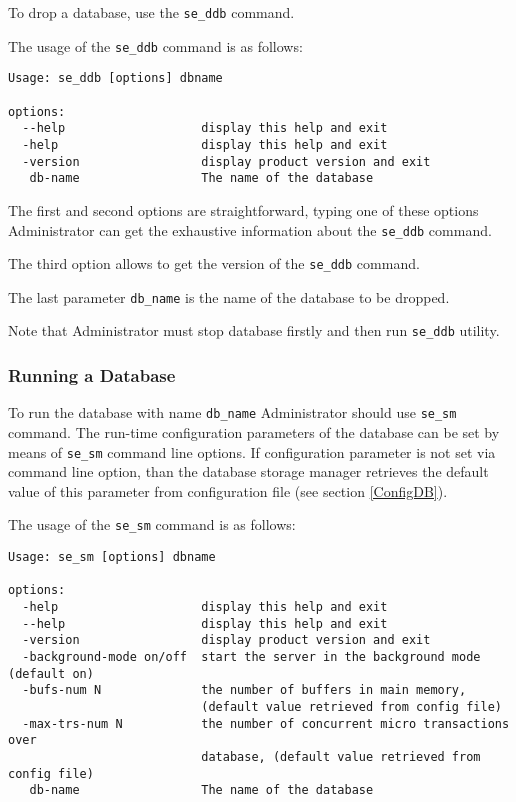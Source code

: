 \documentclass[a4paper,12pt]{article}
\begin{document}
To drop a database, use the \verb!se_ddb! command.

The usage of the \verb!se_ddb! command is as follows:

\begin{verbatim}
Usage: se_ddb [options] dbname

options:
  --help                   display this help and exit
  -help                    display this help and exit
  -version                 display product version and exit
   db-name                 The name of the database
\end{verbatim}

The first and second options are straightforward, typing one of these options Administrator can get the exhaustive information about the \verb!se_ddb! command.

The third option allows to get the version of the \verb!se_ddb! command.

The last parameter \verb!db_name! is the name of the database to be dropped.

Note that Administrator must stop database firstly and then run \verb!se_ddb! utility. 

\subsubsection{Running a Database}
\label{RunDB}

To run the database with name \verb!db_name! Administrator should use \verb!se_sm! command. The run-time configuration parameters of the database can be set by means of \verb!se_sm! command line options. If configuration parameter is not set via command line option, than the database storage manager retrieves the default value of this parameter from configuration file (see section \ref{ConfigDB}).

The usage of the \verb!se_sm! command is as follows:

\begin{verbatim}
Usage: se_sm [options] dbname

options:
  -help                    display this help and exit
  --help                   display this help and exit
  -version                 display product version and exit
  -background-mode on/off  start the server in the background mode (default on)
  -bufs-num N              the number of buffers in main memory,
                           (default value retrieved from config file)
  -max-trs-num N           the number of concurrent micro transactions over
                           database, (default value retrieved from config file)
   db-name                 The name of the database
\end{verbatim}
\end{document}

